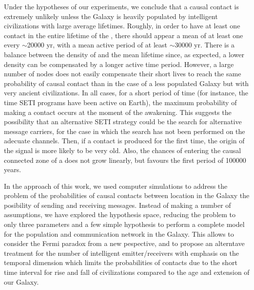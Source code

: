 \documentclass[crop]{CSLB}
\begin{document}
Under the hypotheses of our experiments, we conclude that a causal
contact is extremely unlikely unless the Galaxy is heavily populated
by intelligent civilizations with large average lifetimes.
%
Roughly, in order to have at least one contact in the entire lifetime of the
\ceti{}, there should appear a mean of at least one \ceti{} every $\sim$20000 yr, with
a mean active period of at least $\sim$30000 yr.
%
There is a balance between the density of \cetis{} and the mean
lifetime since, as expected, a lower density can be compensated by a
longer active time period.
%
However, a large number of nodes does not easily compensate their
short lives 
to reach the same probability of causal contact than in the case of a
less populated Galaxy but with very ancient civilizations.
%
In all cases, for a short period of time (for instance, the time SETI
programs have been active on Earth), the maximum probability of making
a contact occurs at the moment of the awakening.
%
This suggests the possibility that an alternative SETI strategy could be
the search for alternative message carriers, for the case in which the
search has not been performed on the adecuate channels.
%
Then, if a contact is produced for the first time, the origin of the
signal is more likely to be very old.
%
Also, the chances of entering the causal connected zone of a \ceti{}
does not grow linearly, but favours the first period of 100000 years.


In the approach of this work, we used computer simulations to address
the problem of the probabilities of causal contacts between location
in the Galaxy the posibility of sending and receiving messages.
%
Instead of making a number of assumptions, we have explored the
hypothesis space, reducing the problem to only three parameters and a
few simple hypothesis to perform a complete model for the population and
communication network in the Galaxy.
%
This allows to consider the Fermi paradox from a new pespective, and
to propose an alterntave treatment for the number of intelligent
emitter/receivers with emphasis on the temporal dimension which limits
the probabilities of contacts due to the short time interval for
rise and fall of civilizations compared to the age and extension of
our Galaxy.









\setlength{\bibsep}{0.0pt}


\end{document}
